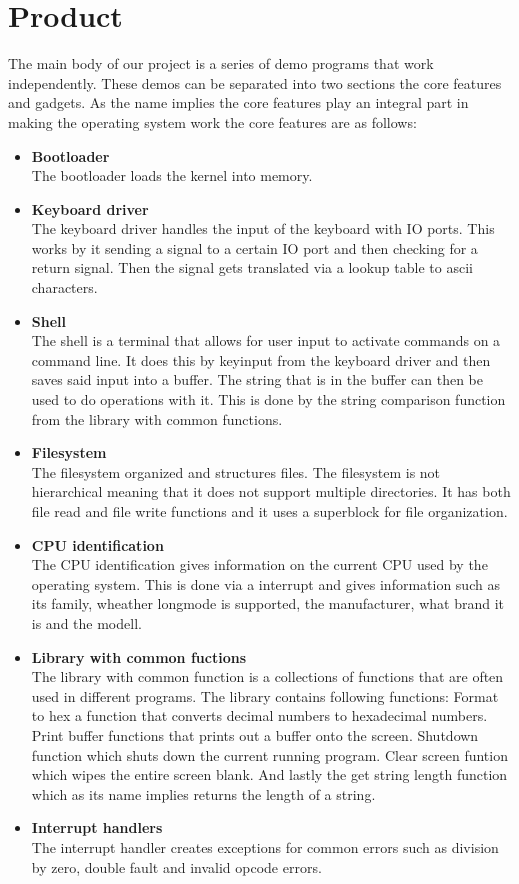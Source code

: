 \section{Product}

The main body of our project is a series of demo programs that work independently.
These demos can be separated into two sections the core features and gadgets.
As the name implies the core features play an integral part in making the operating
system work the core features are as follows:


\begin{itemize}

\item \textbf{Bootloader} \\
The bootloader loads the kernel into memory.
\item \textbf{Keyboard driver} \\
The keyboard driver handles the input of the keyboard with IO ports. This works
by it sending a signal to a certain IO port and then checking for a return signal.
Then the signal gets translated via a lookup table to ascii characters.
\item \textbf{Shell} \\
The shell is a terminal that allows for user input to activate commands on a command
line. It does this by keyinput from the keyboard driver and then saves said input
into a buffer. The string that is in the buffer can then be used to do operations with
it. This is done by the string comparison function from the library with common functions.
\item \textbf{Filesystem} \\
The filesystem organized and structures files. The filesystem is not hierarchical meaning
that it does not support multiple directories. It has both file read and file write functions
and it uses a superblock for file organization.
\item \textbf{CPU identification} \\
The CPU identification gives information on the current CPU used by the operating system.
This is done via a interrupt and gives information such as its family, wheather longmode is
supported, the manufacturer, what brand it is and the modell.
\item \textbf{Library with common fuctions} \\
The library with common function is a collections of functions that are often used in different
programs. The library contains following functions: Format to hex a function that converts decimal
numbers to hexadecimal numbers. Print buffer functions that prints out a buffer onto the screen. 
Shutdown function which shuts down the current running program. Clear screen funtion which wipes
the entire screen blank. And lastly the get string length function which as its name implies returns
the length of a string.
\item \textbf{Interrupt handlers} \\
The interrupt handler creates exceptions for common errors such as division by zero, double fault
and invalid opcode errors.


\end{itemize}


